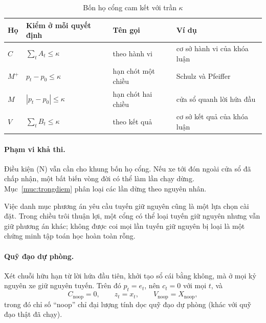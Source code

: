 \begin{table}[htbp]
\centering
\caption{Bốn họ cổng cam kết với trần $\kappa$}
\label{bang:hocong}
\small
\begin{tabularx}{\linewidth}{@{}llXX@{}}
\toprule
\textbf{Họ} & \textbf{Kiểm ở mỗi quyết định} & \textbf{Tên gọi} & \textbf{Ví dụ}\\
\midrule
$C$ & $\sum_t A_t \le \kappa$ & theo hành vi & cơ sở hành vi của khóa luận\\
$M^{+}$ & $p_t - p_0 \le \kappa$ & hạn chót một chiều & Schulz và Pfeiffer \cite{schulz2026}\\
$M$ & $|p_t - p_0| \le \kappa$ & hạn chót hai chiều & cửa sổ quanh lời hứa đầu\\
$V$ & $\sum_t B_t \le \kappa$ & theo kết quả & cơ sở kết quả của khóa luận\\
\bottomrule
\end{tabularx}
\end{table}

\paragraph{Phạm vi khả thi.}
Điều kiện (N) vẫn cần cho khung bốn họ cổng. Nếu xe tới đón ngoài cửa sổ đã chấp nhận,
một bất biến vòng đời có thể làm lần chạy dừng. Mục~\ref{muc:trongdiem} phân loại các lần
dừng theo nguyên nhân.

Việc danh mục phương án yêu cầu tuyến giữ nguyên cũng là một lựa chọn cài đặt. Trong chiều
trôi thuận lợi, một cổng có thể loại tuyến giữ nguyên nhưng vẫn giữ phương án khác; không
được coi mọi lần tuyến giữ nguyên bị loại là một chứng minh tập toán học hoàn toàn rỗng.

\paragraph{Quỹ đạo dự phòng.} Xét chuỗi hữu hạn từ lời hứa đầu tiên, khởi tạo sổ cái bằng
không, mà ở mọi kỷ nguyên xe giữ nguyên tuyến. Trên đó
$p_t = e_t$, nên $c_t = 0$ với mọi $t$, và
\[
C_{\text{noop}} = 0, \qquad z_t = x_t, \qquad V_{\text{noop}} = X_{\text{noop}} ,
\]
trong đó chỉ số ``noop'' chỉ đại lượng tính dọc quỹ đạo dự phòng (khác với quỹ đạo thật đã chạy).

